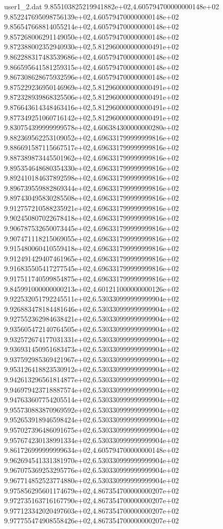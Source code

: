 \begin{filecontents}{user1_2.dat}
9.855103825219941882e+02,4.605794700000000148e+02
9.852247695098756139e+02,4.605794700000000148e+02
9.856547668814055214e+02,4.605794700000000148e+02
9.857268006291149050e+02,4.605794700000000148e+02
9.872388002352940930e+02,5.812960000000000491e+02
9.862288317483539686e+02,4.605794700000000148e+02
9.866595641581259315e+02,4.605794700000000148e+02
9.867308628675932596e+02,4.605794700000000148e+02
9.875229236950146969e+02,5.812960000000000491e+02
9.872328939868325506e+02,5.812960000000000491e+02
9.876643614348463416e+02,5.812960000000000491e+02
9.877349251060716142e+02,5.812960000000000491e+02
9.830754399999999578e+02,4.606384300000000280e+02
9.882369562253109052e+02,4.696331799999999816e+02
9.886691587115667517e+02,4.696331799999999816e+02
9.887389873445501962e+02,4.696331799999999816e+02
9.895354648680354330e+02,4.696331799999999816e+02
9.892410184637892598e+02,4.696331799999999816e+02
9.896739559882869344e+02,4.696331799999999816e+02
9.897430495830285508e+02,4.696331799999999816e+02
9.912757210588235921e+02,4.696331799999999816e+02
9.902450807022678418e+02,4.696331799999999816e+02
9.906787532650073445e+02,4.696331799999999816e+02
9.907471118215069055e+02,4.696331799999999816e+02
9.915480060410559418e+02,4.696331799999999816e+02
9.912491429407461965e+02,4.696331799999999816e+02
9.916835505417277545e+02,4.696331799999999816e+02
9.917511740599854875e+02,4.696331799999999816e+02
9.845991000000000213e+02,4.601211000000000126e+02
9.922532051792245511e+02,6.530330999999999904e+02
9.926883478184481646e+02,6.530330999999999904e+02
9.927552362984638421e+02,6.530330999999999904e+02
9.935605472140764505e+02,6.530330999999999904e+02
9.932572674177031331e+02,6.530330999999999904e+02
9.936931450951683473e+02,6.530330999999999904e+02
9.937592985369421967e+02,6.530330999999999904e+02
9.953126418823530912e+02,6.530330999999999904e+02
9.942613296561814877e+02,6.530330999999999904e+02
9.946979423718887574e+02,6.530330999999999904e+02
9.947633607754205514e+02,6.530330999999999904e+02
9.955730883870969592e+02,6.530330999999999904e+02
9.952653918946598424e+02,6.530330999999999904e+02
9.957027396486091675e+02,6.530330999999999904e+02
9.957674230138991334e+02,6.530330999999999904e+02
9.861726999999999634e+02,4.605794700000000148e+02
9.962694541331381970e+02,6.530330999999999904e+02
9.967075369253295776e+02,6.530330999999999904e+02
9.967714852523774880e+02,6.530330999999999904e+02
9.975856295601174679e+02,4.867354700000000207e+02
9.972735163716167790e+02,4.867354700000000207e+02
9.977123342020497603e+02,4.867354700000000207e+02
9.977755474908558426e+02,4.867354700000000207e+02

\end{filecontents}
